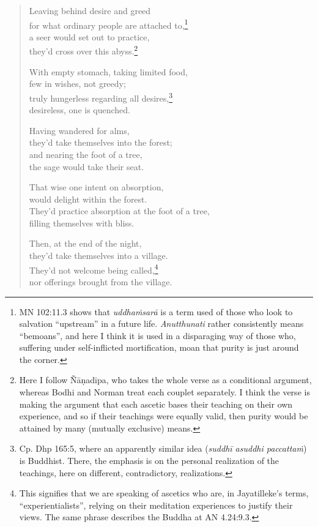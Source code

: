 \documentclass[12pt,openany]{book}%
\begin{document}
\begin{verse}
Leaving behind desire and greed \\
for what ordinary people are attached to,\footnote{MN 102:11.3 shows that \textit{\textsanskrit{uddhaṁsarā}} is a term used of those who look to salvation “upstream” in a future life. \textit{Anutthunati} rather consistently means “bemoans”, and here I think it is used in a disparaging way of those who, suffering under self-inflicted mortification, moan that purity is just around the corner. } \\
a seer would set out to practice, \\
they’d cross over this abyss.\footnote{Here I follow \textsanskrit{Ñāṇadīpa}, who takes the whole verse as a conditional argument, whereas Bodhi and Norman treat each couplet separately. I think the verse is making the argument that each ascetic bases their teaching on their own experience, and so if their teachings were equally valid, then purity would be attained by many (mutually exclusive) means. } 

With empty stomach, taking limited food, \\
few in wishes, not greedy; \\
truly hungerless regarding all desires,\footnote{Cp. Dhp 165:5, where an apparently similar idea (\textit{\textsanskrit{suddhī} asuddhi \textsanskrit{paccattaṁ}}) is Buddhist. There, the emphasis is on the personal realization of the teachings, here on different, contradictory, realizations. } \\
desireless, one is quenched. 

Having wandered for alms, \\
they’d take themselves into the forest; \\
and nearing the foot of a tree, \\
the sage would take their seat. 

That wise one intent on absorption, \\
would delight within the forest. \\
They’d practice absorption at the foot of a tree, \\
filling themselves with bliss. 

Then, at the end of the night, \\
they’d take themselves into a village. \\
They’d not welcome being called,\footnote{This signifies that we are speaking of ascetics who are, in Jayatilleke’s terms, “experientialists”, relying on their meditation experiences to justify their views. The same phrase describes the Buddha at AN 4.24:9.3. } \\
nor offerings brought from the village. 


\end{verse}
\end{document}

